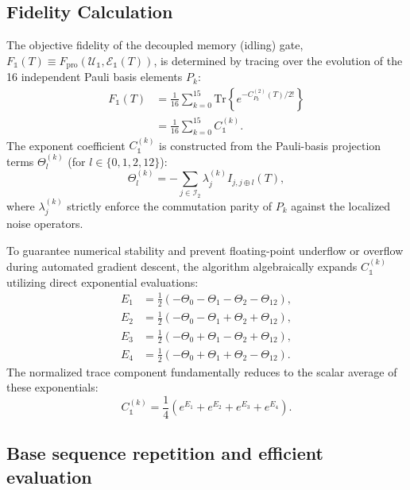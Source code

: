 \documentclass[%
 reprint,
superscriptaddress,
 amsmath,amssymb,
 aps,
pra,
floatfix,
]{revtex4-2}
\newcommand{\qk}[1]{{\color{OliveGreen}#1}}
\begin{document}
\subsection{Fidelity Calculation}
The objective fidelity of the decoupled memory (idling) gate\qk{, $F_\mathbb{1}(T)\equiv F_{\text{pro}}(\mathcal{U}_\mathbb{1},\mathcal{E}_\mathbb{1}(T))$,} is determined by tracing over the evolution of the 16 independent Pauli basis elements $P_k$:
\begin{align}
    F_\mathbb{1}(T) &= \frac{1}{16} \sum_{k=0}^{15} \text{Tr} \left\{ e^{-C_{P_k}^{(2)}(T)/2!} \right\} \nonumber \\
    &= \frac{1}{16} \sum_{k=0}^{15} C_\mathbb{1}^{(k)}.
\end{align}
The exponent coefficient $C_\mathbb{1}^{(k)}$ is constructed from the Pauli-basis projection terms $\Theta_l^{(k)}$ (for $l \in \{0, 1, 2, 12\}$):
\begin{equation}
\Theta^{(k)}_l = -\sum_{j\in\mathcal{I}_2} \lambda^{(k)}_j I_{j,j\oplus l}(T),
\end{equation}
where $\lambda^{(k)}_j$ strictly enforce the commutation parity of $P_k$ against the localized noise operators. 

To guarantee numerical stability and prevent floating-point underflow or overflow during automated gradient descent, the algorithm algebraically expands $C_\mathbb{1}^{(k)}$ utilizing direct exponential evaluations:
\begin{align}
    E_1 &= \frac{1}{2}(-\Theta_0 - \Theta_1 - \Theta_2 - \Theta_{12}), \nonumber \\
    E_2 &= \frac{1}{2}(-\Theta_0 - \Theta_1 + \Theta_2 + \Theta_{12}), \nonumber \\
    E_3 &= \frac{1}{2}(-\Theta_0 + \Theta_1 - \Theta_2 + \Theta_{12}), \nonumber \\
    E_4 &= \frac{1}{2}(-\Theta_0 + \Theta_1 + \Theta_2 - \Theta_{12}).
\end{align}
The normalized trace component fundamentally reduces to the scalar average of these exponentials:
\begin{equation}
    C_\mathbb{1}^{(k)} = \frac{1}{4} \left( e^{E_1} + e^{E_2} + e^{E_3} + e^{E_4} \right).
\end{equation}

\subsection{Base sequence repetition and efficient evaluation}
\label{app::time_folding}
\end{document}
